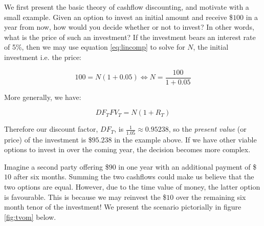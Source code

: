 We first present the basic theory of cashflow discounting, and motivate with
a small example. Given an option to invest an initial amount and receive 
\$$100$ in a year from now, how would you decide whether or not to invest? In
other words, what is the price of such an investment? If the investment bears
an interest rate of 5\%, then we may use equation \ref{eq:lincomp} to solve
for $N$, the initial investment i.e. the price:

\begin{equation}
100 = N (1 + 0.05) \Leftrightarrow N = \frac{100}{1+0.05}
\end{equation}

More generally, we have:

\begin{equation}
DF_T FV_T= N (1 + R_T)
\end{equation}

Therefore our discount factor, $DF_T$, is $\frac{1}{1.05} \approx 0.95238$,
so the \emph{present value} (or price) of the investment is \$$95.238$
in the example above. If we have other viable options to invest in over the coming
year, the decision becomes more complex.

Imagine a second party offering \$$90$ in one year with an additional payment of
\$$10$ after six months. Summing the two cashflows could make us believe that the
two options are equal. However, due to the time value of money, the latter option
is favourable. This is because we may reinvest the \$$10$ over the remaining six
month tenor of the investment! We present the scenario pictorially in figure
\ref{fig:tvom} below.

